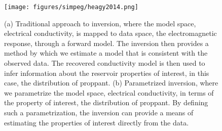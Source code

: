 \begin{figure}[!htbp]
\begin{center}
\texttt{[image: figures/simpeg/heagy2014.png]}
\end{center}
\caption{
(a) Traditional approach to inversion, where the model space, electrical conductivity, is mapped to data space, the electromagnetic response, through a forward model. The inversion then provides a method by which we estimate a model that is consistent with the observed data. The recovered conductivity model is then used to infer information about the reservoir properties of interest, in this case, the distribution of proppant. (b) Parametrized inversion, where we parametrize the model space, electrical conductivity, in terms of the property of interest, the distribution of proppant. By defining such a parametrization, the inversion can provide a means of estimating the properties of interest directly from the data.
}
\label{fig:simpeg-heagy2014}
\end{figure}
